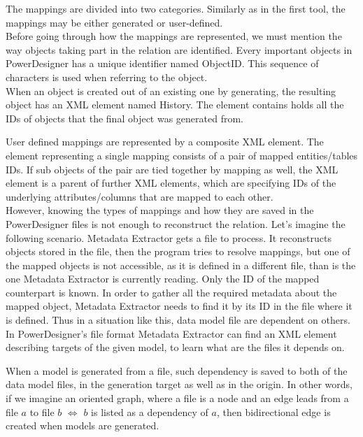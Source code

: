The mappings are divided into two categories. 
Similarly as in the first tool, the mappings may be either generated or user-defined. \\ 


Before going through how the mappings are represented, we must mention the way objects taking part in the relation are identified.
Every important objects in PowerDesigner has a unique identifier named ObjectID. This sequence of characters is used when referring to the object.\\

When an object is created out of an existing one by generating, the resulting object has an XML element named History. The element contains holds all the IDs of objects that the final object was generated from.

User defined mappings are represented by a composite XML element. 
The element representing a single mapping consists of a pair of mapped entities/tables IDs. If sub objects of the pair are tied together by mapping as well, the XML element is a parent of further XML elements, which are specifying IDs of the underlying attributes/columns that are mapped to each other. \\

However, knowing the types of mappings and how they are saved in the PowerDesigner files is not enough to reconstruct the relation. Let's imagine the following scenario.
Metadata Extractor gets a file to process. It reconstructs objects stored in the file, then the program tries to resolve mappings, but one of the mapped objects is not accessible, as it is defined in a different file, than is the one Metadata Extractor is currently reading.
Only the ID of the mapped counterpart is known. 
In order to gather all the required metadata about the mapped object, Metadata Extractor needs to find it by its ID in the file where it is defined.
Thus in a situation like this, data model file are dependent on others.
In PowerDesigner's file format Metadata Extractor can find an XML element describing targets of the given model, to learn what are the files it depends on.

When a model is generated from a file, such dependency is saved to both of the data model files, in the generation target as well as in the origin. 
In other words, if we imagine an oriented graph, where a file is a node and an edge leads from a file $a$ to file $b$ $\iff$ $b$ is listed as a dependency of $a$, then bidirectional edge is created when models are generated.


